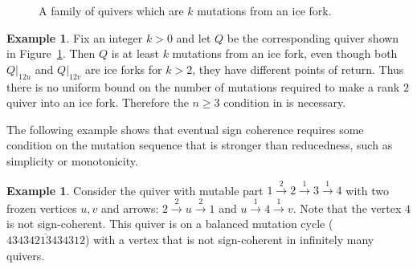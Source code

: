 \documentclass[12pt]{amsart}
\newcommand{\cS}[1]{{\noindent\textsf{\color{purple}$\blacksquare$~#1~$\blacksquare$}}}
\theoremstyle{definition}
\newtheorem{exmp}[thm]{Example}
\theoremstyle{remark}
\numberwithin{equation}{section}
\begin{document}
\begin{figure}
    \centering
{}
    \caption{A family of quivers which are $k$ mutations from an ice fork.}
    \label{fig: 2 vertex far from ice}
\end{figure}

\begin{exmp}
\label{eg: ice forks in rank 2}
Fix an integer $k>0$ and let $Q$ be the corresponding quiver shown in Figure~\ref{fig: 2 vertex far from ice}. 
Then $Q$ is at least $k$ mutations from an ice fork, even though both $Q|_{12u}$ and $Q|_{12v}$ are ice forks for $k>2$, they have different points of return. Thus there is no uniform bound on the number of mutations required to make a rank $2$ quiver into an ice fork.
Therefore the $n \geq 3$ condition in  is necessary. 
\end{exmp}

The following example shows that eventual sign coherence requires some condition on the mutation sequence that is stronger than reducedness, such as simplicity or monotonicity. 

\begin{exmp}
Consider the quiver with mutable part $1 \stackrel{2}{\rightarrow} 2 \stackrel{1}{\rightarrow} 3 \stackrel{1}{\rightarrow} 4$ %
with two frozen vertices $u,v$ and arrows:
$2 \stackrel{2}{\rightarrow} u \stackrel{2}{\rightarrow} 1$ and $u \stackrel{1}{\rightarrow} 4 \stackrel{1}{\rightarrow} v.$ %
Note that the vertex $4$ is not sign-coherent.  This quiver is on a balanced mutation cycle ($\overline{43434213434312}$) with a vertex that is not sign-coherent in infinitely many quivers.  
\end{exmp}
\end{document}
